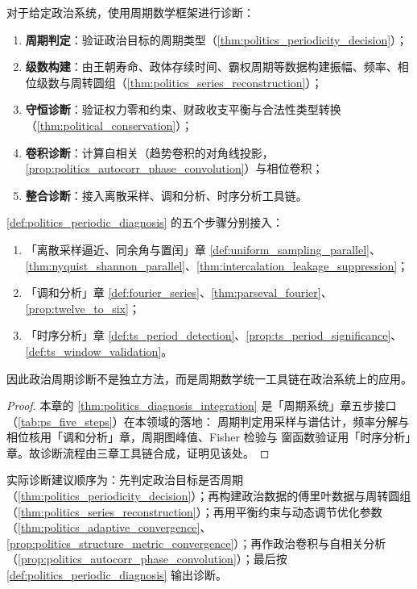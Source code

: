 \begin{definition}[政治周期诊断流程]\label{def:politics_periodic_diagnosis}
对于给定政治系统，使用周期数学框架进行诊断：
\begin{enumerate}[label=(\roman*)]
    \item \textbf{周期判定}：验证政治目标的周期类型（\cref{thm:politics_periodicity_decision}）；
    \item \textbf{级数构建}：由王朝寿命、政体存续时间、霸权周期等数据构建振幅、频率、相位级数与周转圆组（\cref{thm:politics_series_reconstruction}）；
    \item \textbf{守恒诊断}：验证权力零和约束、财政收支平衡与合法性类型转换（\cref{thm:political_conservation}）；
    \item \textbf{卷积诊断}：计算自相关（趋势卷积的对角线投影，\cref{prop:politics_autocorr_phase_convolution}）与相位卷积；
    \item \textbf{整合诊断}：接入离散采样、调和分析、时序分析工具链。
\end{enumerate}
\end{definition}

\begin{theorem}[政治周期诊断流程与三章接口]\label{thm:politics_diagnosis_integration}
\cref{def:politics_periodic_diagnosis} 的五个步骤分别接入：
\begin{enumerate}[label=(\roman*)]
    \item 「离散采样逼近、同余角与置闰」章 \cref{def:uniform_sampling_parallel}、\cref{thm:nyquist_shannon_parallel}、\cref{thm:intercalation_leakage_suppression}；
    \item 「调和分析」章 \cref{def:fourier_series}、\cref{thm:parseval_fourier}、\cref{prop:twelve_to_six}；
    \item 「时序分析」章 \cref{def:ts_period_detection}、\cref{prop:ts_period_significance}、\cref{def:ts_window_validation}。
\end{enumerate}
因此政治周期诊断不是独立方法，而是周期数学统一工具链在政治系统上的应用。
\end{theorem}

\begin{proof}
本章的 \cref{thm:politics_diagnosis_integration} 是「周期系统」章五步接口（\cref{tab:ps_five_steps}）在本领域的落地：
周期判定用采样与谱估计，频率分解与相位核用「调和分析」章，周期图峰值、Fisher 检验与
窗函数验证用「时序分析」章。故诊断流程由三章工具链合成，证明见该处。
\end{proof}

\begin{remark}[整合后的操作顺序]\label{rem:politics_integration_order}
实际诊断建议顺序为：先判定政治目标是否周期（\cref{thm:politics_periodicity_decision}）；再构建政治数据的傅里叶数据与周转圆组（\cref{thm:politics_series_reconstruction}）；再用平衡约束与动态调节优化参数（\cref{thm:politics_adaptive_convergence}、\cref{prop:politics_structure_metric_convergence}）；再作政治卷积与自相关分析（\cref{prop:politics_autocorr_phase_convolution}）；最后按 \cref{def:politics_periodic_diagnosis} 输出诊断。
\end{remark}

